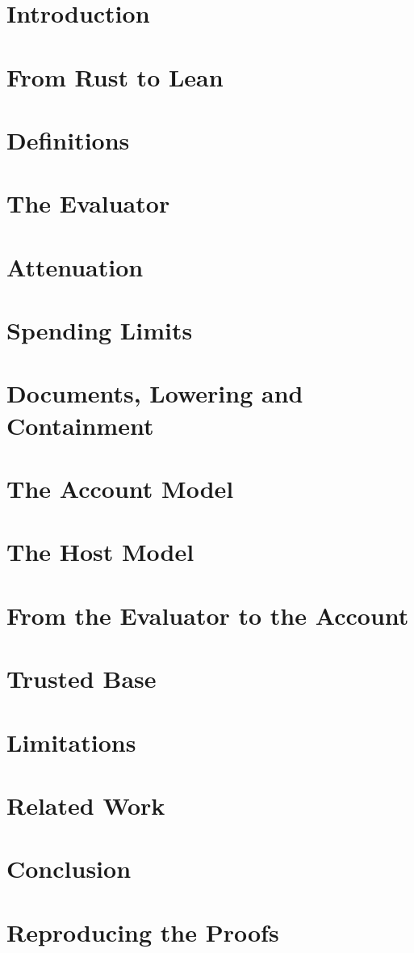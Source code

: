\section{Introduction}\label{sec:objects}

\section{From Rust to Lean}\label{sec:pipeline}

\section{Definitions}\label{sec:definitions}

\section{The Evaluator}\label{sec:evaluator}

\section{Attenuation}\label{sec:attenuation}

\section{Spending Limits}\label{sec:spending}

\section{Documents, Lowering and Containment}\label{sec:documents}

\section{The Account Model}\label{sec:account}

\section{The Host Model}\label{sec:host}

\section{From the Evaluator to the Account}\label{sec:obligations}

\section{Trusted Base}\label{sec:trust}

\section{Limitations}\label{sec:unproved}

\section{Related Work}\label{sec:related}

\section{Conclusion}\label{sec:conclusion}

\appendix
\section{Reproducing the Proofs}\label{sec:reproduce}

